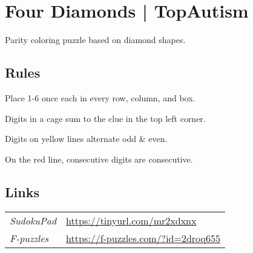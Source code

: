 \section[Four Diamonds | TopAutism {[\emph{Parity}]}]{Four Diamonds | {\normalfont TopAutism}}
\label{sec:10-four-diamonds-topautism}
Parity coloring puzzle based on diamond shapes.

\subsection*{Rules}
\begin{markdown}
Place 1-6 once each in every row, column, and box.

Digits in a cage sum to the clue in the top left corner.

Digits on yellow lines alternate odd & even.

On the red line, consecutive digits are consecutive.
\end{markdown}
\subsection*{Links}
\begin{tabularx}{\textwidth}{l X}
\emph{SudokuPad} & \url{https://tinyurl.com/mr2xdxnx} \\
\emph{F-puzzles} & \url{https://f-puzzles.com/?id=2droq655} \\
\end{tabularx}
\pagebreak
